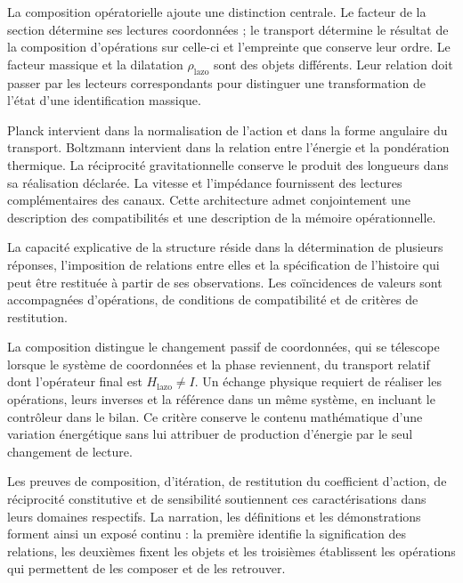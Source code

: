 La composition opératorielle ajoute une distinction centrale. Le facteur
de la section détermine ses lectures coordonnées ; le transport
détermine le résultat de la composition d’opérations sur celle-ci et
l’empreinte que conserve leur ordre. Le facteur massique et la dilatation
$\rho_{\mathrm{lazo}}$ sont des objets différents. Leur relation doit
passer par les lecteurs correspondants pour distinguer une
transformation de l’état d’une identification massique.

Planck intervient dans la normalisation de l’action et dans la forme
angulaire du transport. Boltzmann intervient dans la relation entre
l’énergie et la pondération thermique. La réciprocité gravitationnelle conserve
le produit des longueurs dans sa réalisation déclarée. La vitesse
et l’impédance fournissent des lectures complémentaires des canaux.
Cette architecture admet conjointement une description des
compatibilités et une description de la mémoire opérationnelle.

La capacité explicative de la structure réside dans la détermination de
plusieurs réponses, l’imposition de relations entre elles et la spécification de
l’histoire qui peut être restituée à partir de ses observations. Les
coïncidences de valeurs sont accompagnées d’opérations,
de conditions de compatibilité et de critères de restitution.

La composition distingue le changement passif de coordonnées, qui
se télescope lorsque le système de coordonnées et la phase reviennent, du transport relatif
dont l’opérateur final est $H_{\mathrm{lazo}}\ne I$. Un échange
physique requiert de réaliser les opérations, leurs inverses et la
référence dans un même système, en incluant le contrôleur dans
le bilan. Ce critère conserve le contenu mathématique
d’une variation énergétique sans lui attribuer de production d’énergie
par le seul changement de lecture.

Les preuves de composition, d’itération, de restitution du coefficient
d’action, de réciprocité constitutive et de sensibilité soutiennent
ces caractérisations dans leurs domaines respectifs. La narration,
les définitions et les démonstrations forment ainsi un exposé continu :
la première identifie la signification des relations, les
deuxièmes fixent les objets et les troisièmes établissent les
opérations qui permettent de les composer et de les retrouver.
